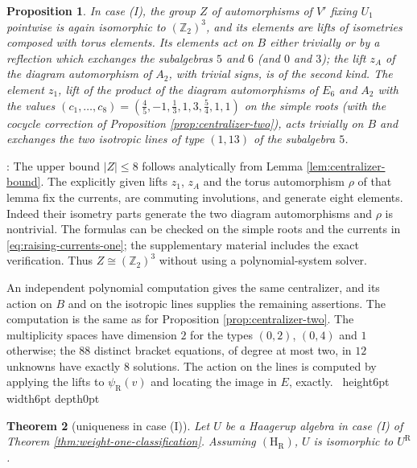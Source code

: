 \documentclass[leqno]{article}
\newcommand{\Z}{\ensuremath{\mathbb{Z}}}
\renewcommand{\leq}{\ensuremath{\leqslant}}
\newcommand{\qed}{\hfill \vrule height6pt  width6pt depth0pt}
\newtheorem{thm}{Theorem}[section]
\newtheorem{prop}[thm]{Proposition}
\newenvironment{proof}[1][]{\noindent {\it Proof #1} : }{\hbox{~}\qed
\smallskip
}
\numberwithin{equation}{section}
\begin{document}
\begin{prop}
\label{prop:centralizer-one}
In case (I), the group $Z$ of automorphisms of $V'$ fixing $U_1$ pointwise is again isomorphic to $(\Z_2)^3$, and its elements are lifts of isometries composed with torus elements. Its elements act on $B$ either trivially or by a reflection which exchanges the subalgebras $5$ and $6$ (and $0$ and $3$); the lift $z_A$ of the diagram automorphism of $A_2$, with trivial signs, is of the second kind. The element $z_1$, lift of the product of the diagram automorphisms of $E_6$ and $A_2$ with the values $(c_1,\ldots,c_8) = (\frac45, -1, \frac13, 1, 3, \frac54, 1, 1)$ on the simple roots (with the cocycle correction of Proposition \ref{prop:centralizer-two}), acts trivially on $B$ and exchanges the two isotropic lines of type $(1,13)$ of the subalgebra $5$.
\end{prop}

\begin{proof}
The upper bound $|Z| \leq 8$ follows analytically from Lemma \ref{lem:centralizer-bound}. The explicitly given lifts $z_1$, $z_A$ and the torus automorphism $\rho$ of that lemma fix the currents, are commuting involutions, and generate eight elements. Indeed their isometry parts generate the two diagram automorphisms and $\rho$ is nontrivial. The formulas can be checked on the simple roots and the currents in \eqref{eq:raising-currents-one}; the supplementary material includes the exact verification. Thus $Z \cong (\Z_2)^3$ without using a polynomial-system solver.

An independent polynomial computation gives the same centralizer, and its action on $B$ and on the isotropic lines supplies the remaining assertions. The computation is the same as for Proposition \ref{prop:centralizer-two}. The multiplicity spaces have dimension $2$ for the types $(0,2)$, $(0,4)$ and $1$ otherwise; the $88$ distinct bracket equations, of degree at most two, in $12$ unknowns have exactly $8$ solutions. The action on the lines is computed by applying the lifts to $\psi_{\mathrm R}(v)$ and locating the image in $E$, exactly.
\end{proof}

\begin{thm}[uniqueness in case (I)]
\label{thm:uniqueness-one}
Let $U$ be a Haagerup algebra in case (I) of Theorem \ref{thm:weight-one-classification}. Assuming $\mathrm{(H_R)}$, $U$ is isomorphic to $U^{\mathrm R}$.
\end{thm}
\end{document}
